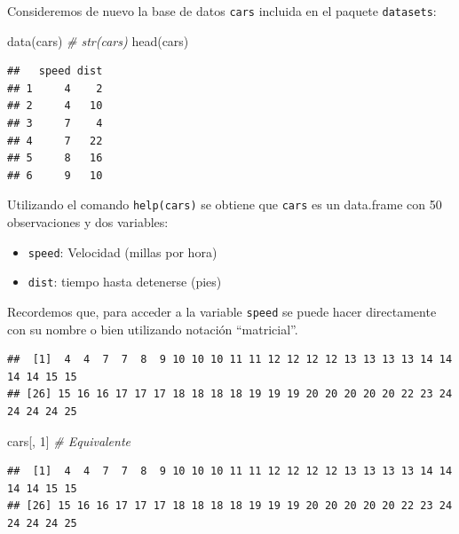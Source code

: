 \documentclass[
]{book}
\newenvironment{Shaded}{\begin{snugshade}}{\end{snugshade}}
\newcommand{\CommentTok}[1]{\textcolor[rgb]{0.56,0.35,0.01}{\textit{#1}}}
\newcommand{\DecValTok}[1]{\textcolor[rgb]{0.00,0.00,0.81}{#1}}
\newcommand{\FunctionTok}[1]{\textcolor[rgb]{0.00,0.00,0.00}{#1}}
\newcommand{\NormalTok}[1]{#1}
\newcommand{\SpecialCharTok}[1]{\textcolor[rgb]{0.00,0.00,0.00}{#1}}
\theoremstyle{break}
\theoremstyle{nonumberplain}
\begin{document}
Consideremos de nuevo la
base de datos \texttt{cars} incluida en el paquete \texttt{datasets}:

\begin{Shaded}
\begin{Highlighting}[]
\FunctionTok{data}\NormalTok{(cars)}
\CommentTok{\# str(cars)}
\FunctionTok{head}\NormalTok{(cars)}
\end{Highlighting}
\end{Shaded}

\begin{verbatim}
##   speed dist
## 1     4    2
## 2     4   10
## 3     7    4
## 4     7   22
## 5     8   16
## 6     9   10
\end{verbatim}

Utilizando el comando \texttt{help(cars)}
se obtiene que \texttt{cars} es un data.frame con 50 observaciones y dos
variables:

\begin{itemize}
\item
  \texttt{speed}: Velocidad (millas por hora)
\item
  \texttt{dist}: tiempo hasta detenerse (pies)
\end{itemize}

Recordemos que, para acceder a la variable \texttt{speed} se puede
hacer directamente con su nombre o bien utilizando notación
``matricial''.

\begin{Shaded}
\end{Shaded}

\begin{verbatim}
##  [1]  4  4  7  7  8  9 10 10 10 11 11 12 12 12 12 13 13 13 13 14 14 14 14 15 15
## [26] 15 16 16 17 17 17 18 18 18 18 19 19 19 20 20 20 20 20 22 23 24 24 24 24 25
\end{verbatim}

\begin{Shaded}
\begin{Highlighting}[]
\NormalTok{cars[, }\DecValTok{1}\NormalTok{]  }\CommentTok{\# Equivalente}
\end{Highlighting}
\end{Shaded}

\begin{verbatim}
##  [1]  4  4  7  7  8  9 10 10 10 11 11 12 12 12 12 13 13 13 13 14 14 14 14 15 15
## [26] 15 16 16 17 17 17 18 18 18 18 19 19 19 20 20 20 20 20 22 23 24 24 24 24 25
\end{verbatim}
\end{document}
